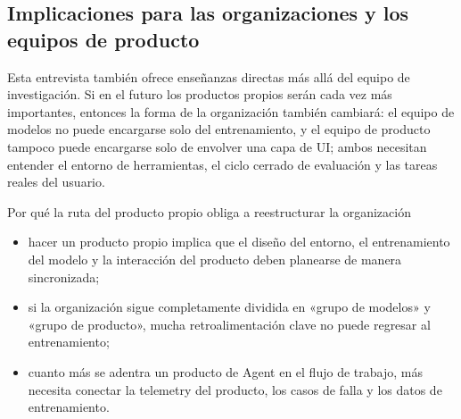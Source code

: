 \subsection{Implicaciones para las organizaciones y los equipos de producto}
Esta entrevista también ofrece enseñanzas directas más allá del equipo de investigación. Si en el futuro los productos propios serán cada vez más importantes, entonces la forma de la organización también cambiará: el equipo de modelos no puede encargarse solo del entrenamiento, y el equipo de producto tampoco puede encargarse solo de envolver una capa de UI; ambos necesitan entender el entorno de herramientas, el ciclo cerrado de evaluación y las tareas reales del usuario.

\begin{knowledgebox}{Por qué la ruta del producto propio obliga a reestructurar la organización}
\begin{itemize}
    \item hacer un producto propio implica que el diseño del entorno, el entrenamiento del modelo y la interacción del producto deben planearse de manera sincronizada;
    \item si la organización sigue completamente dividida en «grupo de modelos» y «grupo de producto», mucha retroalimentación clave no puede regresar al entrenamiento;
    \item cuanto más se adentra un producto de Agent en el flujo de trabajo, más necesita conectar la telemetry del producto, los casos de falla y los datos de entrenamiento.
\end{itemize}
\end{knowledgebox}

